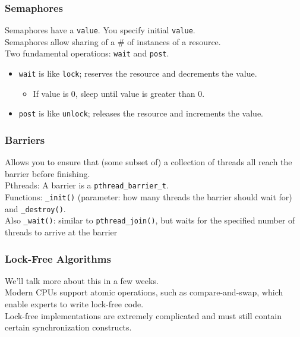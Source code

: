 \begin{frame}
  \frametitle{Semaphores}

    Semaphores have a {\tt value}.
      You specify initial {\tt value}.\\[1em]
    Semaphores allow sharing of a \# of instances of a resource.\\[1em]
    Two fundamental operations: {\tt wait} and {\tt post}.\\[1em]
  \begin{itemize}
    \item {\tt wait} is like {\tt lock}; reserves the resource and decrements the value.
      \begin{itemize}
        \item If value is 0, sleep until value is greater than 0.
      \end{itemize}
    \item {\tt post} is like {\tt unlock}; releases the resource and increments the value.
  \end{itemize}

\end{frame}

\begin{frame}
  \frametitle{Barriers}


    Allows you to ensure that (some subset of) a collection 
    of threads all reach the barrier before finishing.\\[1em]

    Pthreads: A barrier is a {\tt pthread\_barrier\_t}.\\[1em]

    Functions: {\tt \_init()} (parameter: how many threads the barrier
    should wait for) and {\tt \_destroy()}.\\[1em]

    Also {\tt \_wait()}: similar to {\tt pthread\_join()}, but waits
      for the specified number of threads to arrive at the barrier

\end{frame}

\begin{frame}
  \frametitle{Lock-Free Algorithms}


    We'll talk more about this in a few weeks.\\[1em]

    Modern CPUs support atomic operations, such as compare-and-swap, which
enable experts to write lock-free code.\\[1em]

    Lock-free implementations are extremely complicated and must still contain certain synchronization constructs.

\end{frame}

